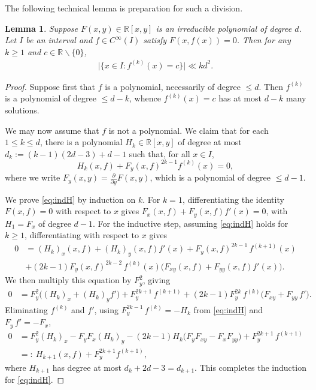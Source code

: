\documentclass[12pt]{amsart}
\newcommand{\R}{{\mathbb R}}
\newcommand{\1}{{\mathbf 1}}
\newtheorem{lemma}[theorem]{Lemma}
\theoremstyle{remark}
\theoremstyle{definition}
\begin{document}
The following technical lemma is preparation for such a division. 
\begin{lemma}\label{lem:5}
Suppose $F(x,y)\in\R[x,y]$ is an irreducible polynomial of degree $d$. Let $I$ be an interval and $f\in C^\infty(I)$ satisfy $F(x,f(x))=0$. Then for any $k\ge1$ and $c\in\R\backslash\{0\}$,
\begin{align*}
\big|\big\{ x\in I : f^{(k)}(x) = c \big\}\big|\ll kd^2.
\end{align*}
\end{lemma}
\begin{proof}
Suppose first that $f$ is a polynomial, necessarily of degree $\leq d$. Then $f^{(k)}$ is a polynomial of degree $\leq d-k$, whence $f^{(k)}(x)=c$ has at most $d-k$ many solutions.

We may now assume that $f$ is not a polynomial. We claim that for each $1\leq k\leq d$, there is a polynomial $H_k\in \R[x,y]$ of degree at most $d_k:=(k-1)(2d-3)+d-1$ such that, for all $x\in I$,
\begin{equation}\label{eq:indH}
H_k(x,f)+ F_y(x,f)^{2k-1} f^{(k)}(x)=0,
\end{equation}
where we write $F_y(x,y) = \frac{\partial}{\partial y}F(x,y)$, which is a polynomial of degree $\leq d-1$.

We prove \eqref{eq:indH} by induction on $k$. For $k=1$, differentiating the identity $F(x,f)=0$ with respect to $x$ gives $F_x(x,f)+ F_y(x,f)f'(x)=0$, with $H_1 = F_x$ of degree $d-1$.
For the inductive step, assuming \eqref{eq:indH} holds for $k\ge1$, differentiating with respect to $x$ gives
\begin{align*}
0 & = (H_{k})_x(x,f) + (H_{k})_y(x,f)f'(x)+ F_y(x,f)^{2k-1}\,f^{(k+1)}(x)\\
& +(2k-1) F_y(x,f)^{2k-2}\,f^{(k)}(x)\big(F_{xy}(x,f) + F_{yy}(x,f)f'(x)\big).
\end{align*}
We then multiply this equation by $F_y^2$, giving
\begin{align*}
0 & = F_y^2\big((H_{k})_x + (H_{k})_yf'\big)+ F_y^{2k+1}\,f^{(k+1)}
+(2k-1) F_y^{2k}\,f^{(k)}\big( F_{xy} + F_{yy}\,f'\big).
\end{align*}
Eliminating $f^{(k)}$ and $f'$, using $ F_y^{2k-1} \, f^{(k)}=-H_k$ from \eqref{eq:indH} and $F_y\,f'=-F_x$,
\begin{align*}
0 & = F_y^2(H_{k})_x - F_yF_x (H_{k})_y
-(2k-1) H_k\big( F_y F_{xy} - F_x F_{yy}\big) + F_y^{2k+1}\,f^{(k+1)}\\
& =: \ H_{k+1}(x,f) +  F_y^{2k+1} f^{(k+1)},
\end{align*}
where $H_{k+1}$ has degree at most $d_k+2d-3=d_{k+1}$. This completes the induction for \eqref{eq:indH}.


\end{proof}
\end{document}

